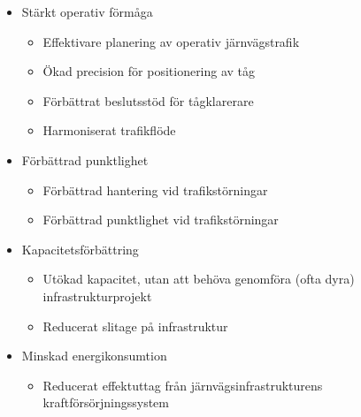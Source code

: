 \begin{itemize}
    \item Stärkt operativ förmåga
    \begin{itemize}
        \item Effektivare planering av operativ järnvägstrafik~\cite{Joborn2023, Tschirner2013, IRS90940}
        \item Ökad precision för positionering av tåg~\cite{Systemdefinition2019, IRS90940}
        \item Förbättrat beslutsstöd för tågklarerare~\cite{Lindmark2022, Tschirner2013}
        \item Harmoniserat trafikflöde~\cite{Systemdefinition2019}
    \end{itemize}
    \item Förbättrad punktlighet
    \begin{itemize}
        \item Förbättrad hantering vid trafikstörningar~\cite{Angel2020, Joborn2023, Lindmark2022, Systemdefinition2019}
        \item Förbättrad punktlighet vid trafikstörningar~\cite{Angel2020, Joborn2023, Lindmark2022, Systemdefinition2019}
    \end{itemize}
    \item Kapacitetsförbättring
    \begin{itemize}
        \item Utökad kapacitet, utan att behöva genomföra (ofta dyra) infrastrukturprojekt~\cite{Lindmark2022, Olsson2023, IRS90940}
        \item Reducerat slitage på infrastruktur~\cite{Angel2020, Joborn2023, Lindmark2022, Systemdefinition2019, Olsson2023}
    \end{itemize}
    \item Minskad energikonsumtion
    \begin{itemize}
        \item Reducerat effektuttag från järnvägsinfrastrukturens kraftförsörjningssystem~\cite{Angel2020, Joborn2023, Lindmark2022, Systemdefinition2019, Olsson2023, Verstappen2022}

\end{itemize}
\end{itemize}
